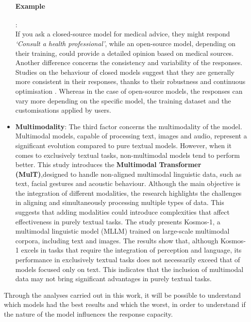 \begin{itemize}
    \paragraph{Example}:\\
    If you ask a closed-source model for medical advice, they might respond \textit{‘Consult a health professional’}, while an open-source model, depending on their training, could provide a detailed opinion based on medical sources. Another difference concerns the consistency and variability of the responses. Studies on the behaviour of closed models suggest that they are generally more consistent in their responses, thanks to their robustness and continuous optimisation \cite{brown2020languagemodelsfewshotlearners}. Whereas in the case of open-source models, the responses can vary more depending on the specific model, the training dataset and the customisations applied by users.
    \item \textbf{Multimodality}: The third factor concerns the multimodality of the model. Multimodal models, capable of processing text, images and audio, represent a significant evolution compared to pure textual models. However, when it comes to exclusively textual tasks, non-multimodal models tend to perform better. This study \cite{tsai2019multimodaltransformerunalignedmultimodal} introduces the \textbf{Multimodal Transformer (MulT)},designed to handle non-aligned multimodal linguistic data, such as text, facial gestures and acoustic behaviour. Although the main objective is the integration of different modalities, the research highlights the challenges in aligning and simultaneously processing multiple types of data.  This suggests that adding modalities could introduce complexities that affect effectiveness in purely textual tasks. The study \cite{huang2023languageneedaligningperception}presents Kosmos-1, a multimodal linguistic model (MLLM) trained on large-scale multimodal corpora, including text and images. The results show that, although Kosmos-1 excels in tasks that require the integration of perception and language, its performance in exclusively textual tasks does not necessarily exceed that of models focused only on text. This indicates that the inclusion of multimodal data may not bring significant advantages in purely textual tasks.   
\end{itemize}
Through the analyses carried out in this work, it will be possible to understand which models had the best results and which the worst, in order to understand if the nature of the model influences the response capacity.
